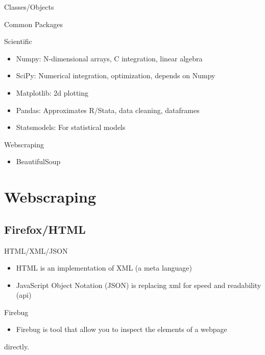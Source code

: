 \documentclass[presentation]{beamer}
\begin{document}
\begin{frame}[label=sec-4-2-3]{Classes/Objects}
\end{frame}

\begin{frame}[label=sec-4-2-4]{Common Packages}
\begin{block}{Scientific}
\begin{itemize}
\item Numpy: N-dimensional arrays, C integration, linear algebra
\item SciPy: Numerical integration, optimization, depends on Numpy
\item Matplotlib: 2d plotting
\item Pandas: Approximates R/Stata, data cleaning, dataframes
\item Statsmodels: For statistical models
\end{itemize}
\end{block}
\begin{block}{Webscraping}
\begin{itemize}
\item BeautifulSoup
\end{itemize}
\end{block}
\end{frame}


\section{Webscraping}
\label{sec-5}

\subsection{Firefox/HTML}
\label{sec-5-1}

\begin{frame}[label=sec-5-1-1]{HTML/XML/JSON}
\begin{itemize}
\item HTML is an implementation of XML (a meta language)
\item JavaScript Object Notation (JSON) is replacing xml for speed and readability (api)
\end{itemize}
\end{frame}

\begin{frame}[label=sec-5-1-2]{Firebug}
\begin{itemize}
\item Firebug is tool that allow you to inspect the elements of a webpage
\end{itemize}
directly. 
\end{frame}
\end{document}
